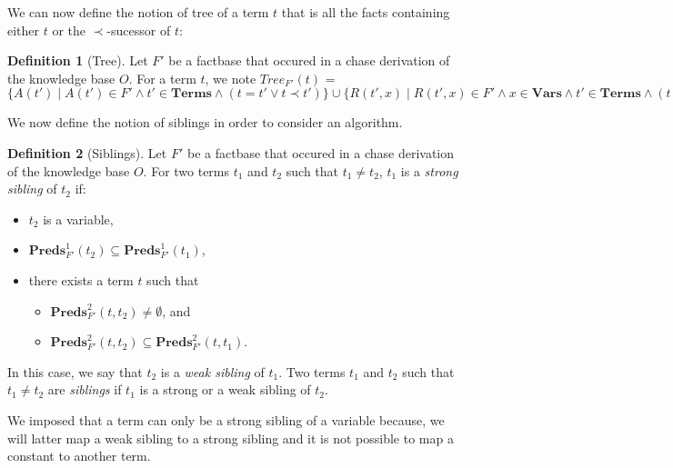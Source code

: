 \documentclass{article}
\theoremstyle{definition}
\newtheorem{definition}{Definition}[section]
\theoremstyle{remark}
\newcommand{\Vars}{\textbf{Vars}}
\newcommand{\Terms}{\textbf{Terms}}
\newcommand{\Preds}{\textbf{Preds}}
\newcommand{\Tree}{\textit{Tree}}
\begin{document}
We can now define the notion of tree of a term $t$ that is all the facts containing either $t$ or the $\prec$-sucessor of $t$:

\begin{definition}[Tree]
Let $F'$ be a factbase that occured in a chase derivation of the knowledge base $O$. For a term $t$, we note \emph{$\Tree_{F'}(t)$} = $\{A(t') \mid A(t') \in F' \wedge t' \in \Terms \wedge (t = t' \vee t \prec t')\} \cup \{R(t',x) \mid R(t',x) \in F' \wedge x \in \Vars \wedge t' \in \Terms \wedge (t = t' \vee t \prec t')\}$
\end{definition}


%

We now define the notion of siblings in order to consider an algorithm.

\begin{definition}[Siblings]
Let $F'$ be a factbase that occured in a chase derivation of the knowledge base $O$. For two terms $t_1$ and $t_2$ such that $t_1 \neq t_2$, $t_1$ is a \emph{strong sibling} of $t_2$ if:
\begin{itemize}
\item $t_2$ is a variable,
\item $\Preds_{F'}^1(t_2) \subseteq \Preds_{F'}^1(t_1)$,
\item there exists a term $t$ such that
	\begin{itemize}
	\item $\Preds^2_{F'}(t,t_2) \neq \emptyset$, and
	\item $\Preds_{F'}^2(t,t_2) \subseteq \Preds_{F'}^2(t,t_1)$.
	\end{itemize}
\end{itemize}
In this case, we say that  $t_2$ is a \emph{weak sibling} of $t_1$. Two terms $t_1$ and $t_2$ such that $t_1 \neq t_2$ are \emph{siblings} if $t_1$ is a strong or a weak sibling of $t_2$.

\end{definition}

We imposed that a term can only be a strong sibling of a variable because, we will latter map a weak sibling to a strong sibling and it is not possible to map a constant to another term.
\end{document}
